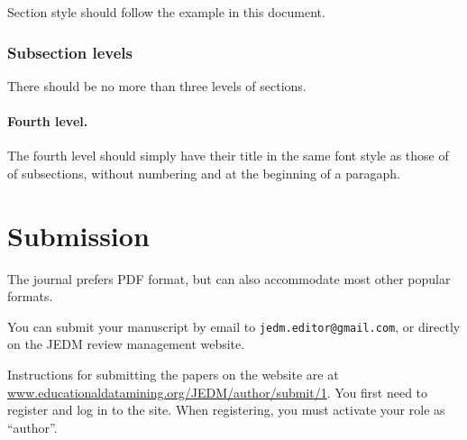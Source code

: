 \documentclass[a4,notitlepage,12pt]{jedm}
\begin{document}
Section style should follow the example in this document.

\subsubsection{Subsection levels}

There should be no more than three levels of sections.

\paragraph{Fourth level.}

The fourth level should simply have their title in the same font style as those of of subsections, without numbering and at the beginning of a paragaph.

\section{Submission}

The journal prefers PDF format, but can also accommodate most other popular formats.  

You can submit your manuscript by email to \texttt{jedm.editor@gmail.com}, or directly on the JEDM review management website.

Instructions for submitting the papers on the website are at \url{www.educationaldatamining.org/JEDM/author/submit/1}.  You first need to register and log in to the site.  When registering, you must activate your role as ``author''.




\end{document}

